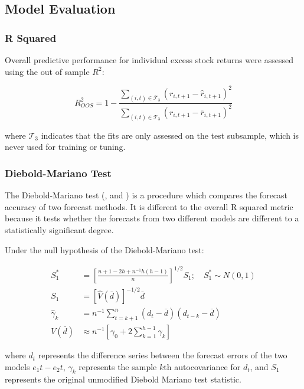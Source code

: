 \documentclass[a4paper, table]{article}
\begin{document}
\subsection{Model Evaluation}
\label{model_evaluation}

\subsubsection{R Squared}

Overall predictive performance for individual excess stock returns were assessed using the out of sample $R^2$:

\begin{equation}
	R^2_{OOS} = 1 - \frac{\sum_{(i, t)\in\mathcal{T}_3}(r_{i, t+1} - \widehat{r}_{i, t+1})^2}
		{\sum_{(i, t)\in\mathcal{T}_3} \left( r_{i, t+1} - \bar{r}_{i, t+1} \right) ^2}
\end{equation}

where $\mathcal{T}_3$ indicates that the fits are only assessed on the test subsample, which is never used for training or tuning. 

\subsubsection{Diebold-Mariano Test}

The Diebold-Mariano test (\cite{diebold_comparing_2002}, and \cite{harvey_testing_1997}) is a procedure which compares the forecast accuracy of two forecast methods. It is different to the overall R squared metric because it tests whether the forecasts from two different models are different to a statistically significant degree. 

Under the null hypothesis of the Diebold-Mariano test:

\begin{align}
	S_1^* &= \left[ 
		\frac{n + 1 - 2h + n^{-1}h(h-1)}
			{n} 
	\right]^{1/2}S_1 ; \quad S_1^* \sim N(0,1) \\
	S_1 &= \left[ 
		\hat{V}(\bar{d})
	\right] ^{-1/2}\bar{d} \\
	\hat{\gamma}_k &= n^{-1} \sum_{t = k + 1}^{n}(d_t - \bar{d})(d_{t-k} - \bar{d}) \\
	V(\bar{d}) &\approx n^{-1}\left[ 
		\gamma_0 + 2 \sum_{k = 1}^{h - 1}\gamma_k
	\right] 
\end{align}

where $d_t$ represents the difference series between the forecast errors of the two models $e_1t - e_2t$, $\hat{\gamma}_k$ represents the sample $k$th autocovariance for $d_t$, and $S_1$ represents the original unmodified Diebold Mariano test statistic.
\end{document}
